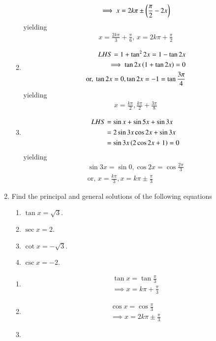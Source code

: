 \begin{enumerate}[label=\thesubsection.\arabic*,ref=\thesubsection.\theenumi]
\begin{enumerate}
\begin{align}
	 \implies x = 2k\pi \pm \left(\frac{\pi}{2}-2x\right) 
\end{align}
yielding
\begin{align}
	x = 
	  \frac{2k\pi }{3}+\frac{\pi}{6},\,
	x = 
	  2k\pi +\frac{\pi}{2}
\end{align}
\item 
\begin{align}
LHS = 1+\tan^2 2x=1-\tan2x
\\
\implies 
	\tan 2x\left(1+\tan2x\right) = 0
	\\
	\text{or, }
	\tan 2x = 0, \tan2x = -1= \tan \frac{3\pi}{4} 
\end{align}
yielding
\begin{align}
	x = \frac{k\pi}{2}, \frac{k\pi}{2}+\frac{3\pi}{8} 
\end{align}
\item 
\begin{align}
	LHS &= \sin x+\sin5x+\sin3x
	\\
	&= 2\sin 3x\cos 2x+\sin3x
	\\
	&= \sin 3x\left(2\cos 2x+1\right)=0
\end{align}
yielding
\begin{align}
 \sin 3x=\sin 0, \cos 2x=\cos \frac{2\pi}{3}
 \\
	\text{or, }
	x = \frac{k\pi}{3}, x = k\pi \pm \frac{\pi}{3}
\end{align}
\end{enumerate}
\item Find the principal and general solutions of the following equations
\begin{enumerate}
\item $\tan x=\sqrt 3$.
\item $\sec x=2$.
\item $\cot x=-\sqrt 3$.
\item $\csc x=-2$.
\end{enumerate}
\solution
\begin{enumerate}
\item 
\begin{align}
\tan x=\tan \frac{\pi}{3}
\\
\implies x = k\pi + \frac{\pi}{3}
\end{align}
\item 
\begin{align}
\cos x=\cos \frac{\pi}{3}
\\
\implies x = 2k\pi \pm \frac{\pi}{3}
\end{align}
\item 
\begin{align}

\end{align}
\end{enumerate}
\end{enumerate}
